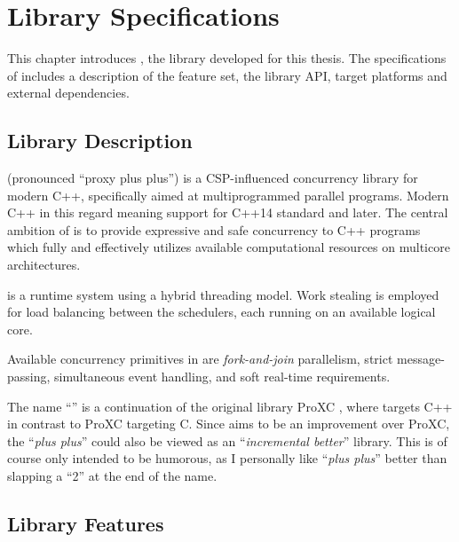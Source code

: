 
\chapter{Library Specifications}
\label{ch:library_specifications}


This chapter introduces \Proxc{}, the library developed for this thesis. The specifications of \Proxc{} includes a description of the feature set, the library API, target platforms and external dependencies. 


\section{Library Description}
\label{sec:library_overview}


\Proxc{} (pronounced ``proxy plus plus'') is a CSP\hyp{}influenced concurrency library for modern C++, specifically aimed at multiprogrammed parallel programs. Modern C++ in this regard meaning support for C++14 standard and later. The central ambition of \Proxc{} is to provide expressive and safe concurrency to C++ programs which fully and effectively utilizes available computational resources on multicore architectures.

\Proxc{} is a runtime system using a hybrid threading model. Work stealing is employed for load balancing between the schedulers, each running on an available logical core. 

Available concurrency primitives in \Proxc{} are \textit{fork\hyp{}and\hyp{}join} parallelism, strict message\hyp{}passing, simultaneous event handling, and soft real\hyp{}time requirements.

The name ``\Proxc{}'' is a continuation of the original library ProXC \citep{pettersen2016proxc}, where \Proxc{} targets C++ in contrast to ProXC targeting C. Since \Proxc{} aims to be an improvement over ProXC, the ``\textit{plus plus}'' could also be viewed as an ``\textit{incremental better}'' library. This is of course only intended to be humorous, as I personally like ``\textit{plus plus}'' better than slapping a ``2'' at the end of the name.


\section{Library Features}
\label{sec:library_features}


